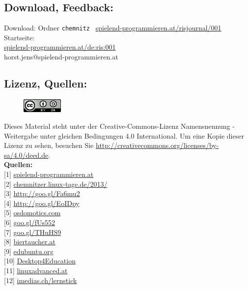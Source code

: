 \documentclass[10pt,a4paper,ngerman,twoside]{article} %
\newcommand{\SepRule}{\noindent	%
\begin{center}
\rule{250pt}{1pt} %
\end{center}
}
\begin{document}
\begin{multicols}{3}
\subsection*{Download, Feedback:}
\footnotesize{
Download: Ordner \texttt{chemnitz} \Mundus\ \href{http://spielend-programmieren.at/risjournal/001}{spielend-programmieren.at/risjournal/001}\\
Startseite:\\
\href{http://spielend-programmieren.at/de:ris:001}{spielend-programmieren.at/de:ris:001}\\ 
\Letter\: horst.jens@spielend-programmieren.at}
\normalsize

\subsection*{Lizenz, Quellen:}
\begin{figure}
\includegraphics[width=2cm]{chemnitz/ccbysa88x31.png}
\end{figure}
Dieses Material steht unter der Creative-Commons-Lizenz Namensnennung - Weitergabe unter gleichen Bedingungen 4.0 International. Um eine Kopie dieser Lizenz zu sehen, besuchen Sie \url{http://creativecommons.org/licenses/by-sa/4.0/deed.de}. \\

\textbf{Quellen:} \\
{[}1{]} \href{http://spielend-programmieren.at}{spielend-programmieren.at} \\
{[}2{]} \href{http://chemnitzer.linux-tage.de/2013/}{chemnitzer.linux-tage.de/2013/} \\
{[}3{]} \href{http://wiki.skolelinux.de/KurtGramlich/Biografie}{http://goo.gl/Fa6mu2} \\
{[}4{]} \href{http://datenkanal.org/archives/14-Interview-mit-Kurt-Gramlich-zu-Skolelinux.html}{http://goo.gl/EoIDpy} \\
{[}5{]} \href{http://osdomotics.com}{osdomotics.com} \\
{[}6{]} \href{http://spielend-programmieren.at/de:sonstiges:alter_blog:2009:0318_chemnitzer_linux-tage_2009}{goo.gl/fUs552} \\
{[}7{]} \href{https://plus.google.com/u/0/112888349007751740309/about}{goo.gl/THuHS9} \\
{[}8{]} \href{http://biertaucher.at}{biertaucher.at} \\
{[}9{]} \href{http://www.edubuntu.org/}{edubuntu.org} \\
{[}10{]} \href{http://d4e.at/}{Desktop4Education} \\
{[}11{]} \href{http://www.linuxadvanced.at/}{linuxadvanced.at} \\
{[}12{]} \href{http://www.imedias.ch/lernstick}{imedias.ch/lernstick} 


\end{multicols}
\end{document}
